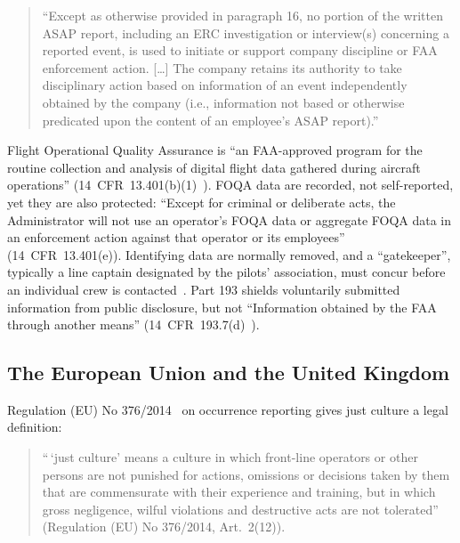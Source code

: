 \documentclass[review,12pt]{elsarticle}
\makeatletter
\renewcommand\paragraph{\@startsection{paragraph}{4}{\z@}{1.5ex \@plus .5ex \@minus .2ex}{-1em}{\normalfont\normalsize\bfseries}}
\makeatother
\begin{document}
\begin{quote}
``Except as otherwise provided in paragraph 16, no portion of the written ASAP report, including an ERC investigation or interview(s) concerning a reported event, is used to initiate or support company discipline or FAA enforcement action. {[}\ldots{]} The company retains its authority to take disciplinary action based on information of an event independently obtained by the company (i.e., information not based or otherwise predicated upon the content of an employee's ASAP report).'' \cite[para.~16.4, Note]{faa2020}
\end{quote}

\paragraph{FOQA.} Flight Operational Quality Assurance is ``an FAA-approved program for the routine collection and analysis of digital flight data gathered during aircraft operations'' (14~CFR~13.401(b)(1)~\cite{cfr13401}). FOQA data are recorded, not self-reported, yet they are also protected: ``Except for criminal or deliberate acts, the Administrator will not use an operator's FOQA data or aggregate FOQA data in an enforcement action against that operator or its employees'' (14~CFR~13.401(e)). Identifying data are normally removed, and a ``gatekeeper'', typically a line captain designated by the pilots' association, must concur before an individual crew is contacted~\cite[para.~6.b(5)]{faa2004}. Part 193 shields voluntarily submitted information from public disclosure, but not ``Information obtained by the FAA through another means'' (14~CFR~193.7(d)~\cite{cfr1937}).

\subsection{The European Union and the United Kingdom}\label{sec:eu}

Regulation (EU) No 376/2014~\cite{eu376} on occurrence reporting gives just culture a legal definition:

\begin{quote}
``\,`just culture' means a culture in which front-line operators or other persons are not punished for actions, omissions or decisions taken by them that are commensurate with their experience and training, but in which gross negligence, wilful violations and destructive acts are not tolerated'' (Regulation (EU) No 376/2014, Art.~2(12)).
\end{quote}
\end{document}
